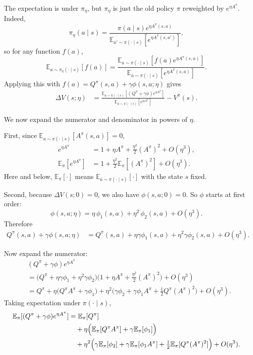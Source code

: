 \documentclass[11pt]{article}
\theoremstyle{definition}
\theoremstyle{remark}
\newcommand{\E}{\mathbb{E}}
\begin{document}
The expectation is under $\pi_\eta$, but $\pi_\eta$ is just the old policy $\pi$ reweighted by $e^{\eta A^\pi}$. Indeed,
\[
  \pi_\eta(a\mid s)
  =
  \frac{\pi(a\mid s)e^{\eta A^\pi(s,a)}}
       {\E_{a'\sim\pi(\cdot\mid s)}[e^{\eta A^\pi(s,a')}]},
\]
so for any function $f(a)$,
\[
  \E_{a\sim\pi_\eta(\cdot\mid s)}[f(a)]
  =
  \frac{
    \E_{a\sim\pi(\cdot\mid s)}[f(a)e^{\eta A^\pi(s,a)}]
  }{
    \E_{a\sim\pi(\cdot\mid s)}[e^{\eta A^\pi(s,a)}]
  }.
\]
Applying this with $f(a)=Q^\pi(s,a)+\gamma\phi(s,a;\eta)$ gives
\begin{align}
  \Delta V(s;\eta)
  &=
  \frac{
    \E_{a\sim\pi(\cdot\mid s)}\!\left[(Q^\pi+\gamma\phi)e^{\eta A^\pi}\right]
  }{
    \E_{a\sim\pi(\cdot\mid s)}[e^{\eta A^\pi}]
  }
  - V^\pi(s).
\end{align}

We now expand the numerator and denominator in powers of $\eta$.

First, since $\E_{a\sim\pi(\cdot\mid s)}[A^\pi(s,a)]=0$,
\begin{align}
  e^{\eta A^\pi}
  &= 1 + \eta A^\pi + \frac{\eta^2}{2}(A^\pi)^2 + O(\eta^3), \\
  \E_\pi[e^{\eta A^\pi}]
  &= 1 + \frac{\eta^2}{2}\E_\pi[(A^\pi)^2] + O(\eta^3).
\end{align}
Here and below, $\E_\pi[\cdot]$ means $\E_{a\sim\pi(\cdot\mid s)}[\cdot]$ with the state $s$ fixed.

Second, because $\Delta V(s;0)=0$, we also have $\phi(s,a;0)=0$. So $\phi$ starts at first order:
\begin{equation}
  \phi(s,a;\eta)
  =
  \eta\,\phi_1(s,a) + \eta^2\,\phi_2(s,a) + O(\eta^3).
\end{equation}
Therefore
\begin{align}
  Q^\pi(s,a) + \gamma\phi(s,a;\eta)
  &=
  Q^\pi(s,a)
  + \eta\gamma\phi_1(s,a)
  + \eta^2\gamma\phi_2(s,a)
  + O(\eta^3).
\end{align}

Now expand the numerator:
\begin{align}
  &(Q^\pi+\gamma\phi)e^{\eta A^\pi} \nonumber\\
  &=
  \bigl(Q^\pi + \eta\gamma\phi_1 + \eta^2\gamma\phi_2\bigr)
  \bigl(1 + \eta A^\pi + \tfrac{\eta^2}{2}(A^\pi)^2\bigr)
  + O(\eta^3) \nonumber\\
  &=
  Q^\pi
  + \eta\bigl(Q^\pi A^\pi + \gamma\phi_1\bigr)
  + \eta^2\bigl(\gamma\phi_2 + \gamma\phi_1A^\pi + \tfrac12 Q^\pi (A^\pi)^2\bigr)
  + O(\eta^3).
\end{align}
Taking expectation under $\pi(\cdot\mid s)$,
\begin{align}
  \E_\pi[(Q^\pi+\gamma\phi)e^{\eta A^\pi}]
  &=
  \E_\pi[Q^\pi] \nonumber\\
  &\quad
  + \eta\Bigl(\E_\pi[Q^\pi A^\pi] + \gamma\E_\pi[\phi_1]\Bigr) \nonumber\\
  &\quad
  + \eta^2\Bigl(
      \gamma\E_\pi[\phi_2]
      + \gamma\E_\pi[\phi_1A^\pi]
      + \tfrac12 \E_\pi[Q^\pi(A^\pi)^2]
    \Bigr)
  + O(\eta^3).
\end{align}
\end{document}
